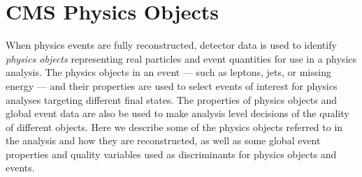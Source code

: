 \section{CMS Physics Objects}
\label{sec:physicsobjects}

When physics events are fully reconstructed, detector data is used to identify {\it physics objects} representing real particles and event quantities for use in a physics analysis. The physics objects in an event --- such as leptons, jets, or missing energy --- and their properties are used to select events of interest for physics analyses targeting different final states. The properties of physics objects and global event data are also be used to make analysis level decisions of the quality of different objects. Here we describe some of the physics objects referred to in the \mttwo analysis and how they are reconstructed, as well as some global event properties and quality variables used as discriminants for physics objects and events.

